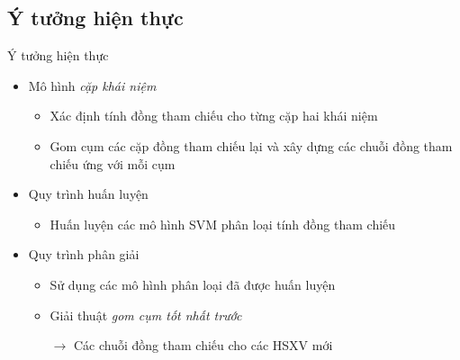 \subsection*{Ý tưởng hiện thực}
\begin{frame}{Ý tưởng hiện thực}
\putlogo
\begin{itemize}
	\item Mô hình \emph{cặp khái niệm}
	\begin{itemize}
		\item Xác định tính đồng tham chiếu cho từng cặp hai khái niệm
		\item Gom cụm các cặp đồng tham chiếu lại và xây dựng các chuỗi đồng tham chiếu ứng với mỗi cụm
	\end{itemize}
	\item Quy trình huấn luyện
	\begin{itemize}
		\item Huấn luyện các mô hình SVM phân loại tính đồng tham chiếu 
	\end{itemize}
	\item Quy trình phân giải
	\begin{itemize}
		\item Sử dụng các mô hình phân loại đã được huấn luyện
		\item Giải thuật \emph{gom cụm tốt nhất trước}
		\item[\boldmath$\rightarrow$] Các chuỗi đồng tham chiếu cho các HSXV mới
	\end{itemize}
\end{itemize}
\end{frame}

